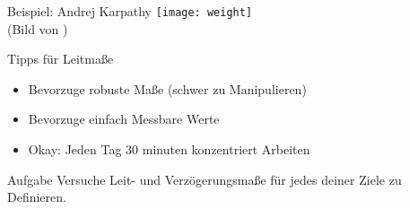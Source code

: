 \begin{frame}[c]{Beispiel: Andrej Karpathy}
    \texttt{[image: weight]} \\
    (Bild von \cite{weight-pic})
\end{frame}


\begin{frame}[c]{Tipps für Leitmaße}
    \large
    \begin{itemize}[<+(1)->]
        \item Bevorzuge robuste Maße (schwer zu Manipulieren)
        \item Bevorzuge einfach Messbare Werte
        \item Okay: Jeden Tag 30 minuten konzentriert Arbeiten
    \end{itemize}
\end{frame}


\begin{frame}[c]
    \large
    \begin{block}{Aufgabe}
        Versuche Leit- und Verzögerungsmaße für jedes deiner Ziele zu
        Definieren.
    \end{block}
\end{frame}


%
%
%
%




